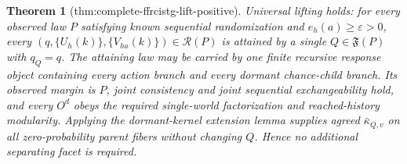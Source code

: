 \documentclass{article}
\newtheorem{theorem}{Theorem}
\begin{document}
\begin{theorem}[thm:complete-ffrcistg-lift-positive]\label{thm:complete-ffrcistg-lift-positive}
Universal lifting holds: for every observed law \(P\) satisfying known sequential randomization and \(e_h(a)\geq\varepsilon>0\), every \((q,\{U_h(k)\},\{V_{ha}(k)\})\in\mathcal R(P)\) is attained by a single \(Q\in\mathfrak F(P)\) with \(q_Q=q\).  The attaining law may be carried by one finite recursive response object containing every action branch and every dormant chance-child branch.  Its observed margin is \(P\), joint consistency and joint sequential exchangeability hold, and every \(O^d\) obeys the required single-world factorization and reached-history modularity.  Applying the dormant-kernel extension lemma supplies agreed \(\bar\kappa_{Q,v}\) on all zero-probability parent fibers without changing \(Q\).  Hence no additional separating facet is required.
\end{theorem}
\end{document}
